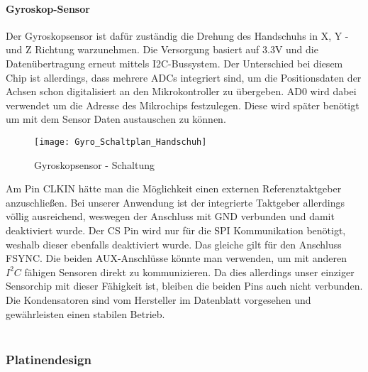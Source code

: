 \documentclass[titlepage,12pt,twoside]{article}
\begin{document}
\paragraph{Gyroskop-Sensor}
\hfill \break
\hfill \break
Der Gyroskopsensor ist dafür zuständig die Drehung des Handschuhs in X, Y -und Z Richtung warzunehmen. Die Versorgung basiert 
auf 3.3V und die Datenübertragung erneut mittels I2C-Bussystem. Der Unterschied bei diesem Chip ist allerdings, dass mehrere ADCs
integriert sind, um die Positionsdaten der Achsen schon digitalisiert an den Mikrokontroller zu übergeben. AD0 wird dabei verwendet
um die Adresse des Mikrochips festzulegen. Diese wird später benötigt um mit dem Sensor Daten austauschen zu können.
\\
\begin{figure}[H]
	\begin{center}
		\scalebox{0.5}
		{\texttt{[image: Gyro\_Schaltplan\_Handschuh]}}
		\caption{Gyroskopsensor - Schaltung}
		\label{fig:Gyro_Schaltplan_Handschuh}		
	\end{center}
\end{figure}
\hfill \break
Am Pin CLKIN hätte man die Möglichkeit einen externen Referenztaktgeber anzuschließen. Bei unserer Anwendung ist der integrierte 
Taktgeber allerdings völlig ausreichend, weswegen der Anschluss mit GND verbunden und damit deaktiviert wurde. Der CS Pin wird nur
für die SPI Kommunikation benötigt, weshalb dieser ebenfalls deaktiviert wurde. Das gleiche gilt für den Anschluss FSYNC. Die beiden
AUX-Anschlüsse könnte man verwenden, um mit anderen $I^{2}C$ fähigen Sensoren direkt zu kommunizieren. Da dies allerdings unser einziger
Sensorchip mit dieser Fähigkeit ist, bleiben die beiden Pins auch nicht verbunden. Die Kondensatoren sind vom Hersteller im Datenblatt
vorgesehen und gewährleisten einen stabilen Betrieb. \\
\\

\subsubsection{Platinendesign}
\end{document}
